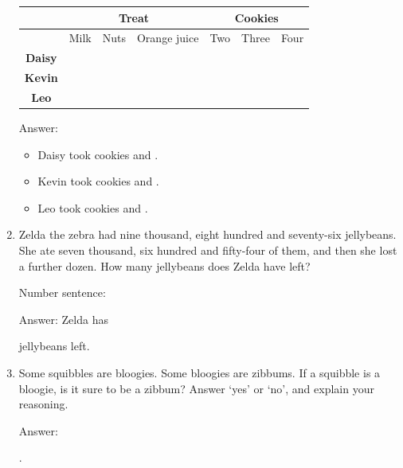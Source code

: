 \documentclass{tufte-book}
\providecommand{\tabularnewline}{\\}
\begin{document}
\begin{enumerate}
\begin{tabular}{|c|c|c|c|c|c|c|}
  \hline 
   & \multicolumn{3}{c|}{\textbf{Treat}} & \multicolumn{3}{c|}{\textbf{Cookies}}\tabularnewline
  \hline 
   & Milk & Nuts & Orange juice & Two & Three & Four\tabularnewline
  \hline 
  \hline 
  \textbf{Daisy} &  &  &  &  &  & \tabularnewline
  \hline 
  \textbf{Kevin} &  &  &  &  &  & \tabularnewline
  \hline 
  \textbf{Leo} &  &  &  &  &  & \tabularnewline
  \hline 
\end{tabular}  

Answer:\bigskip
\begin{itemize}
  \item Daisy took \dotfill\bigskip cookies and \dotfill\bigskip.
  \item Kevin took \dotfill\bigskip cookies and \dotfill\bigskip.
  \item Leo took \dotfill\bigskip cookies and \dotfill\bigskip.
\end{itemize}

\item Zelda the zebra had nine thousand, eight hundred and seventy-six jellybeans.
She ate seven thousand, six hundred and fifty-four of them, and then she lost a further dozen.
How many jellybeans does Zelda have left?\medskip\par
Number sentence: \dotfill\medskip\par
Answer: Zelda has 
\dotfill\medskip\par\mbox{}\dotfill\medskip\par\mbox{}\dotfill\bigskip\par\dotfill\bigskip
 jellybeans left.

\item Some squibbles are bloogies. Some bloogies are zibbums.
If a squibble is a bloogie, is it sure to be a zibbum? Answer `yes'
or `no', and explain your reasoning.\bigskip\par
Answer: \dotfill\bigskip\par\dotfill\bigskip\par\dotfill\bigskip.

\end{enumerate}
\end{document}
